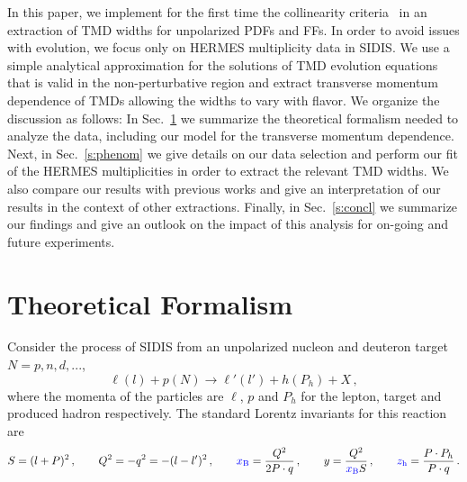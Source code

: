 \documentclass[final,3p,times,onecolumn,sort&compress,hidelinks]{elsarticle}
\newcommand{\xbj}{\ensuremath{{\cbl x_{\rm B}}}}
\newcommand{\zh}{\ensuremath{{\cbl z_{\rm h}}}}
\newcommand\3[1]{\boldsymbol{#1}}
\newcommand{\cbl}{\color{blue}}
\begin{document}

  
In this paper, we  implement for the first time the collinearity criteria~\cite{Boglione:2016bph} in an extraction of TMD widths for unpolarized PDFs and FFs.  In order to avoid issues with evolution, we focus only on HERMES multiplicity data in SIDIS.  We use a simple analytical approximation for the solutions of TMD evolution equations that is valid in the non-perturbative region and  extract transverse momentum dependence of TMDs allowing the widths to vary with flavor.
 We organize the discussion as follows: In Sec.~\ref{s:model} we summarize the theoretical formalism needed to analyze the data, including our model for the transverse momentum dependence.  Next, in Sec.~\ref{s:phenom} we give details on our data selection and perform our fit of the HERMES multiplicities in order to extract the relevant TMD widths.  We also compare our results with previous works and give an interpretation of our results in the context of  other extractions.  Finally, in Sec.~\ref{s:concl} we summarize our findings and give an outlook on the impact of this analysis for on-going and future experiments.



\section{Theoretical Formalism}
\label{s:model}
Consider the process of SIDIS from an unpolarized nucleon and deuteron target $N=p,n,d,...$,
\begin{equation}
\ell(l)+p(N)\to \ell'(l') + h(P_h) + X\,,
\end{equation}
where the momenta of the particles are  $\ell$, $p$ and $P_h$ for the lepton, target and produced hadron respectively.
 The standard Lorentz invariants for this reaction are
\begin{equation}
  S = (l+P)^2\,, \quad\quad Q^2 = -q^2 = -(l-l')^2\,, \quad\quad \xbj = \frac{Q^2} {2P\cdot q}\,, \quad\quad y = \frac{Q^2} {\xbj S}\,, \quad\quad
  \zh = \frac{P\cdot P_h} {P\cdot q}\,.
\end{equation}
\end{document}

